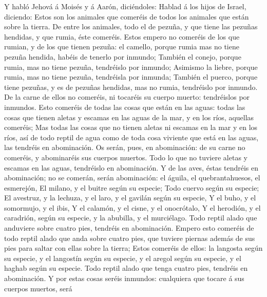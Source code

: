  Y habló Jehová á Moisés y á Aarón, diciéndoles:
 Hablad á los hijos de Israel, diciendo: Estos son los
animales que comeréis de todos los animales que están sobre la tierra.
 De entre los animales, todo el de pezuña, y que tiene las
pezuñas hendidas, y que rumia, éste comeréis.  Estos
empero no comeréis de los que rumian, y de los que tienen pezuña: el
camello, porque rumia mas no tiene pezuña hendida, habéis de tenerlo por
inmundo;  También el conejo, porque rumia, mas no tiene
pezuña, tendréislo por inmundo;  Asimismo la liebre,
porque rumia, mas no tiene pezuña, tendréisla por inmunda;
 También el puerco, porque tiene pezuñas, y es de pezuñas
hendidas, mas no rumia, tendréislo por inmundo.  De la
carne de ellos no comeréis, ni tocaréis su cuerpo muerto: tendréislos
por inmundos.  Esto comeréis de todas las cosas que están
en las aguas: todas las cosas que tienen aletas y escamas en las aguas
de la mar, y en los ríos, aquellas comeréis;  Mas todas
las cosas que no tienen aletas ni escamas en la mar y en los ríos, así
de todo reptil de agua como de toda cosa viviente que está en las aguas,
las tendréis en abominación.  Os serán, pues, en
abominación: de su carne no comeréis, y abominaréis sus cuerpos muertos.
 Todo lo que no tuviere aletas y escamas en las aguas,
tendréislo en abominación.  Y de las aves, éstas tendréis
en abominación; no se comerán, serán abominación: el águila, el
quebrantahuesos, el esmerejón,  El milano, y el buitre
según su especie;  Todo cuervo según su especie;
 El avestruz, y la lechuza, y el laro, y el gavilán según
su especie,  Y el buho, y el somormujo, y el ibis,
 Y el calamón, y el cisne, y el onocrótalo,
 Y el herodión, y el caradrión, según su especie, y la
abubilla, y el murciélago.  Todo reptil alado que
anduviere sobre cuatro pies, tendréis en abominación. 
Empero esto comeréis de todo reptil alado que anda sobre cuatro pies,
que tuviere piernas además de sus pies para saltar con ellas sobre la
tierra;  Estos comeréis de ellos: la langosta según su
especie, y el langostín según su especie, y el aregol según su especie,
y el haghab según su especie.  Todo reptil alado que
tenga cuatro pies, tendréis en abominación.  Y por estas
cosas seréis inmundos: cualquiera que tocare á sus cuerpos muertos, será
